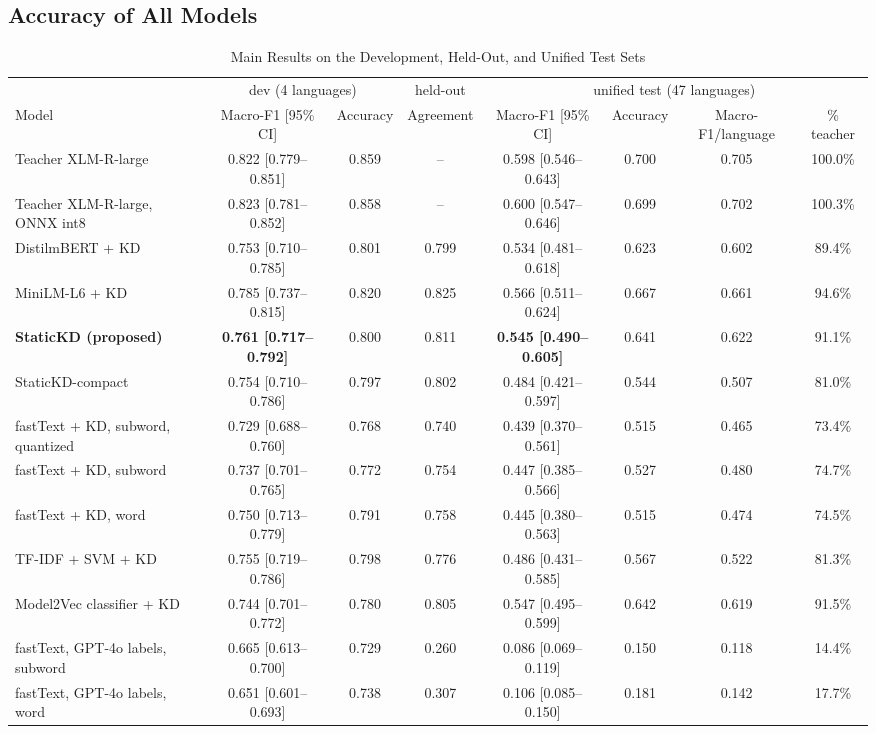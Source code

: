 \documentclass{ieeeaccess}
\begin{document}
\subsection{Accuracy of All Models}
\label{sec:res-acc}
\begin{table}[!t]
\caption{Main Results on the Development, Held-Out, and Unified Test Sets}
\label{tab:main}
\centering
\scriptsize
\setlength{\tabcolsep}{3.5pt}
\begin{tabular}{@{}lccccccc@{}}
\toprule
 & \multicolumn{2}{c}{dev (4 languages)} & held-out & \multicolumn{4}{c}{unified test (47 languages)} \\
\cmidrule(lr){2-3}\cmidrule(lr){4-4}\cmidrule(lr){5-8}
Model & Macro-F1 [95\% CI] & Accuracy & Agreement & Macro-F1 [95\% CI] & Accuracy & Macro-F1/language & \% teacher \\
\midrule
Teacher XLM-R-large & 0.822 [0.779--0.851] & 0.859 & -- & 0.598 [0.546--0.643] & 0.700 & 0.705 & 100.0\% \\
Teacher XLM-R-large, ONNX int8 & 0.823 [0.781--0.852] & 0.858 & -- & 0.600 [0.547--0.646] & 0.699 & 0.702 & 100.3\% \\
\midrule
DistilmBERT + KD & 0.753 [0.710--0.785] & 0.801 & 0.799 & 0.534 [0.481--0.618] & 0.623 & 0.602 & 89.4\% \\
MiniLM-L6 + KD & 0.785 [0.737--0.815] & 0.820 & 0.825 & 0.566 [0.511--0.624] & 0.667 & 0.661 & 94.6\% \\
\midrule
\textbf{StaticKD (proposed)} & \textbf{0.761 [0.717--0.792]} & 0.800 & 0.811 & \textbf{0.545 [0.490--0.605]} & 0.641 & 0.622 & 91.1\% \\
StaticKD-compact & 0.754 [0.710--0.786] & 0.797 & 0.802 & 0.484 [0.421--0.597] & 0.544 & 0.507 & 81.0\% \\
\midrule
fastText + KD, subword, quantized & 0.729 [0.688--0.760] & 0.768 & 0.740 & 0.439 [0.370--0.561] & 0.515 & 0.465 & 73.4\% \\
fastText + KD, subword & 0.737 [0.701--0.765] & 0.772 & 0.754 & 0.447 [0.385--0.566] & 0.527 & 0.480 & 74.7\% \\
fastText + KD, word & 0.750 [0.713--0.779] & 0.791 & 0.758 & 0.445 [0.380--0.563] & 0.515 & 0.474 & 74.5\% \\
TF-IDF + SVM + KD & 0.755 [0.719--0.786] & 0.798 & 0.776 & 0.486 [0.431--0.585] & 0.567 & 0.522 & 81.3\% \\
Model2Vec classifier + KD & 0.744 [0.701--0.772] & 0.780 & 0.805 & 0.547 [0.495--0.599] & 0.642 & 0.619 & 91.5\% \\
\midrule
fastText, GPT-4o labels, subword & 0.665 [0.613--0.700] & 0.729 & 0.260 & 0.086 [0.069--0.119] & 0.150 & 0.118 & 14.4\% \\
fastText, GPT-4o labels, word & 0.651 [0.601--0.693] & 0.738 & 0.307 & 0.106 [0.085--0.150] & 0.181 & 0.142 & 17.7\% \\
\bottomrule
\end{tabular}
\end{table}
\end{document}
